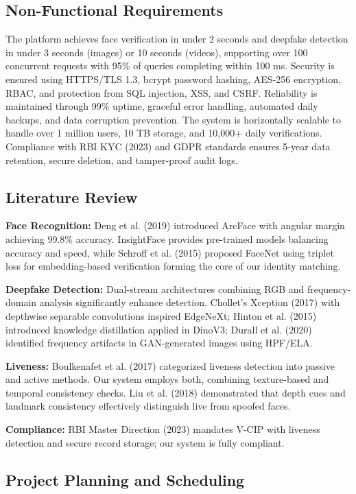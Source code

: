 \documentclass[12pt,a4paper]{article}
\begin{document}
\subsection{Non-Functional Requirements}

The platform achieves face verification in under 2 seconds and deepfake detection in under 3 seconds (images) or 10 seconds (videos), supporting over 100 concurrent requests with 95\% of queries completing within 100 ms. Security is ensured using HTTPS/TLS 1.3, bcrypt password hashing, AES-256 encryption, RBAC, and protection from SQL injection, XSS, and CSRF. Reliability is maintained through 99\% uptime, graceful error handling, automated daily backups, and data corruption prevention. The system is horizontally scalable to handle over 1 million users, 10 TB storage, and 10,000+ daily verifications. Compliance with RBI KYC (2023) and GDPR standards ensures 5-year data retention, secure deletion, and tamper-proof audit logs.

\subsection{Literature Review}

\textbf{Face Recognition:} Deng et al. (2019) introduced ArcFace with angular margin achieving 99.8\% accuracy. InsightFace provides pre-trained models balancing accuracy and speed, while Schroff et al. (2015) proposed FaceNet using triplet loss for embedding-based verification forming the core of our identity matching.

\textbf{Deepfake Detection:} Dual-stream architectures combining RGB and frequency-domain analysis significantly enhance detection. Chollet’s Xception (2017) with depthwise separable convolutions inspired EdgeNeXt; Hinton et al. (2015) introduced knowledge distillation applied in DinoV3; Durall et al. (2020) identified frequency artifacts in GAN-generated images using HPF/ELA.

\textbf{Liveness:} Boulkenafet et al. (2017) categorized liveness detection into passive and active methods. Our system employs both, combining texture-based and temporal consistency checks. Liu et al. (2018) demonstrated that depth cues and landmark consistency effectively distinguish live from spoofed faces.

\textbf{Compliance:} RBI Master Direction (2023) mandates V-CIP with liveness detection and secure record storage; our system is fully compliant.

\subsection{Project Planning and Scheduling}
\end{document}
